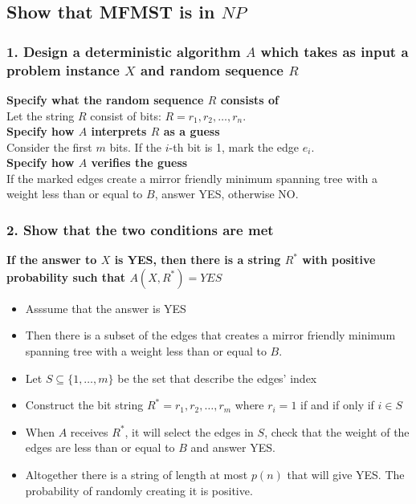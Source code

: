 \documentclass[12pt]{report}
\begin{document}
\subsection{Show that MFMST is in $NP$}
\subsubsection{1. Design a deterministic algorithm $A$ which takes as input a problem instance $X$ and random sequence $R$}

\textbf{Specify what the random sequence $R$ consists of}\\
Let the string $R$ consist of bits: $R = r_1,r_2,\dots,r_n$.\\

\textbf{Specify how $A$ interprets $R$ as a guess}\\
Consider the first $m$ bits. If the $i$-th bit is 1, mark the edge $e_i$.\\

\textbf{Specify how $A$ verifies the guess}\\
If the marked edges create a mirror friendly minimum spanning tree with a weight less than or equal to $B$, answer YES, otherwise NO.

\subsubsection{2. Show that the two conditions are met}
\textbf{If the answer to $X$ is YES, then there is a string $R^*$ with positive probability such that $A(X, R^*) = YES$}
\begin{itemize}
	\item[] Asssume that the answer is YES
	
	\item[] Then there is a subset of the edges that creates a mirror friendly minimum spanning tree with a weight less than or equal to $B$.
	
	\item[] Let $S \subseteq \{1,\dots,m\}$ be the set that describe the edges' index
	
	\item[] Construct the bit string $R^* = r_1,r_2,\dots,r_m$ where $r_i = 1$ if and if only if $i \in S$
	
	\item[] When $A$ receives $R^*$, it will select the edges in $S$, check that the weight of the edges are less than or equal to $B$ and answer YES.
	
	\item[] Altogether there is a string of length at most $p(n)$ that will give YES. The probability of randomly creating it is positive.
\end{itemize}
\end{document}
